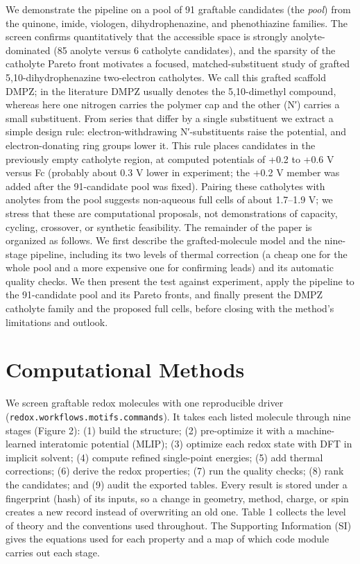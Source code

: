 \documentclass[journal=jcisd8,manuscript=article]{achemso}
\begin{document}
We demonstrate the pipeline on a pool of 91 graftable candidates (the \emph{pool}) from the quinone, imide, viologen, dihydrophenazine, and phenothiazine families. The screen confirms quantitatively that the accessible space is strongly anolyte-dominated (85 anolyte versus 6 catholyte candidates), and the sparsity of the catholyte Pareto front motivates a focused, matched-substituent study of grafted 5,10-dihydrophenazine two-electron catholytes. We call this grafted scaffold DMPZ; in the literature DMPZ usually denotes the 5,10-dimethyl compound, whereas here one nitrogen carries the polymer cap and the other (N′) carries a small substituent. From series that differ by a single substituent we extract a simple design rule: electron-withdrawing N′-substituents raise the potential, and electron-donating ring groups lower it. This rule places candidates in the previously empty catholyte region, at computed potentials of +0.2 to +0.6 V versus Fc (probably about 0.3 V lower in experiment; the +0.2 V member was added after the 91-candidate pool was fixed). Pairing these catholytes with anolytes from the pool suggests non-aqueous full cells of about 1.7–1.9 V; we stress that these are computational proposals, not demonstrations of capacity, cycling, crossover, or synthetic feasibility. The remainder of the paper is organized as follows. We first describe the grafted-molecule model and the nine-stage pipeline, including its two levels of thermal correction (a cheap one for the whole pool and a more expensive one for confirming leads) and its automatic quality checks. We then present the test against experiment, apply the pipeline to the 91-candidate pool and its Pareto fronts, and finally present the DMPZ catholyte family and the proposed full cells, before closing with the method's limitations and outlook.

\section{Computational Methods}

We screen graftable redox molecules with one reproducible driver (\texttt{redox.workflows.motifs.commands}). It takes each listed molecule through nine stages (Figure 2): (1) build the structure; (2) pre-optimize it with a machine-learned interatomic potential (MLIP); (3) optimize each redox state with DFT in implicit solvent; (4) compute refined single-point energies; (5) add thermal corrections; (6) derive the redox properties; (7) run the quality checks; (8) rank the candidates; and (9) audit the exported tables. Every result is stored under a fingerprint (hash) of its inputs, so a change in geometry, method, charge, or spin creates a new record instead of overwriting an old one. Table 1 collects the level of theory and the conventions used throughout. The Supporting Information (SI) gives the equations used for each property and a map of which code module carries out each stage.
\end{document}
